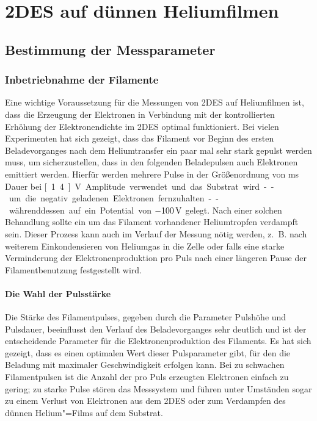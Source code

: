 \chapter{2DES auf dünnen Heliumfilmen}

\section{Bestimmung der Messparameter}
\label{sec:film_messpar}

\subsection{Inbetriebnahme der Filamente}
\label{ssec:chargespeed}
Eine wichtige Voraussetzung für die Messungen von 2DES auf Heliumfilmen ist, dass die Erzeugung der Elektronen in Verbindung mit der kontrollierten Erhöhung der Elektronendichte im 2DES optimal funktioniert. Bei vielen Experimenten hat sich gezeigt, dass das Filament vor Beginn des ersten Beladevorganges nach dem Heliumtransfer ein paar mal sehr stark gepulst werden muss, um sicherzustellen, dass in den folgenden Beladepulsen auch Elektronen emittiert werden. Hierfür werden mehrere Pulse in der Größenordnung von \unit[400]{ms} Dauer bei \unit[1.4]{V} Amplitude verwendet und das Substrat wird -- um die negativ geladenen Elektronen fernzuhalten -- währenddessen auf ein Potential von $\unit[-100]{V}$ gelegt. Nach einer solchen Behandlung sollte ein um das Filament vorhandener Heliumtropfen verdampft sein. Dieser Prozess kann auch im Verlauf der Messung nötig werden, z.~B. nach weiterem Einkondensieren von Heliumgas in die Zelle oder falls eine starke Verminderung der Elektronenproduktion pro Puls nach einer längeren Pause der Filamentbenutzung festgestellt wird.

\subsubsection{Die Wahl der Pulsstärke}
Die Stärke des Filamentpulses, gegeben durch die Parameter Pulshöhe und Pulsdauer, beeinflusst den Verlauf des Beladevorganges sehr deutlich und ist der entscheidende Parameter für die Elektronenproduktion des Filaments. Es hat sich gezeigt, dass es einen optimalen Wert dieser Pulsparameter gibt, für den die Beladung mit maximaler Geschwindigkeit erfolgen kann. Bei zu schwachen Filamentpulsen ist die Anzahl der pro Puls erzeugten Elektronen einfach zu gering; zu starke Pulse stören das Messsystem und führen unter Umständen sogar zu einem Verlust von Elektronen aus dem 2DES oder zum Verdampfen des dünnen Helium"=Films auf dem Substrat.

